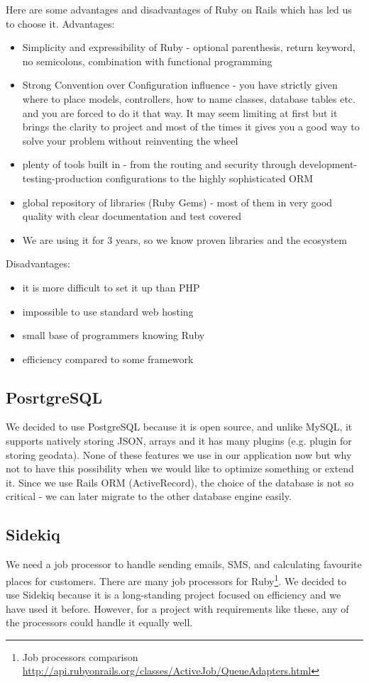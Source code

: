 Here are some advantages and disadvantages of Ruby on Rails which has led us to choose it.
Advantages:
\begin{itemize}
	\item Simplicity and expressibility of Ruby - optional parenthesis, return keyword, no semicolons, combination with functional programming 
	\item Strong Convention over Configuration influence - you have strictly given where to place models, controllers, how to name classes, database tables etc. and you are forced to do it that way. It may seem limiting at first but it brings the clarity to project and most of the times it gives you a good way to solve your problem without reinventing the wheel
	\item plenty of tools built in - from the routing and security through development-testing-production configurations to the highly sophisticated ORM
	\item global repository of libraries (Ruby Gems) - most of them in very good quality with clear documentation and test covered
	\item We are using it for 3 years, so we know proven libraries and the ecosystem
\end{itemize} 
Disadvantages:
\begin{itemize}
	\item it is more difficult to set it up than PHP
	\item impossible to use standard web hosting
	\item small base of programmers knowing Ruby
	\item efficiency compared to some framework
\end{itemize}
  
\subsection{PosrtgreSQL}
We decided to use PostgreSQL because it is open source, and unlike MySQL, it supports natively storing JSON, arrays and it has many plugins (e.g. plugin for storing geodata). None of these features we use in our application now but why not to have this possibility when we would like to optimize something or extend it. Since we use Rails ORM (ActiveRecord), the choice of the database is not so critical - we can later migrate to the other database engine easily.
\subsection{Sidekiq}
We need a job processor to handle sending emails, SMS, and calculating favourite places for customers. 
There are many job processors for Ruby\footnote{ Job processors comparison \url{http://api.rubyonrails.org/classes/ActiveJob/QueueAdapters.html}}. We decided to use Sidekiq because it is a long-standing project focused on efficiency and we have used it before. However, for a project with requirements like these, any of the processors could handle it equally well. 
